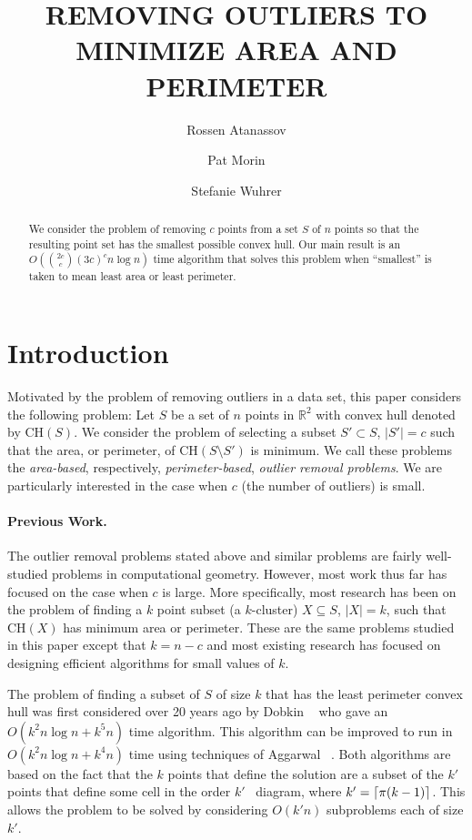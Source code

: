 \documentclass[lotsofwhite]{patmorin}
\title{\MakeUppercase{Removing Outliers to Minimize Area and Perimeter}}
\author{Rossen Atanassov \and
    Pat Morin \and
    Stefanie Wuhrer}
\date{}
\newcommand{\ch}{\mathrm{CH}}
\newcommand{\runtime}{{2c\choose c}(3c)^c n\log n}
\begin{document}
\maketitle

\begin{abstract}
We consider the problem of removing $c$ points from a set $S$ of $n$
points so that the resulting point set has the smallest possible
convex hull.  Our main result is an $O(\runtime)$ time algorithm
that solves this problem when ``smallest'' is taken to mean least area
or least perimeter.
\end{abstract}

\section{Introduction}

Motivated by the problem of removing outliers in a data set, this
paper considers the following problem: Let $S$ be a set of $n$ points
in $\mathbb{R}^2$ with convex hull denoted by $\ch(S)$.  We consider
the problem of selecting a subset $S'\subset S$, $|S'|=c$ such that
the area, or perimeter, of $\ch(S\setminus S')$ is minimum.  We call
these problems the \emph{area-based}, respectively,
\emph{perimeter-based}, \emph{outlier removal problems}.  We are
particularly interested in the case when $c$ (the number of outliers)
is small.

\paragraph{Previous Work.} 

The outlier removal problems stated above and similar problems are
fairly well-studied problems in computational geometry.  However, most
work thus far has focused on the case when $c$ is large. More
specifically, most research has been on the problem of finding a $k$
point subset (a $k$-cluster) $X\subseteq S$, $|X|=k$, such that
$\ch(X)$ has minimum area or perimeter. These are the same problems
studied in this paper except that $k=n-c$ and most existing research
has focused on designing efficient algorithms for small values of $k$.

The problem of finding a subset of $S$ of size $k$ that has the least
perimeter convex hull was first considered over 20 years ago by Dobkin
\etal\ \cite{ddg83} who gave an $O(k^2n\log n + k^5 n)$ time
algorithm.  This algorithm can be improved to run in $O(k^2 n\log n +
k^4 n)$ time using techniques of Aggarwal \etal\ \cite{aiks89}.  Both
algorithms are based on the fact that the $k$ points that define the
solution are a subset of the $k'$ points that define some cell in the
order $k'$ \voronoi\ diagram, where $k'=\left\lceil \pi (k-1) \right\rceil$.  This
allows the problem to be solved by considering $O(k'n)$ subproblems
each of size $k'$.
\end{document}
